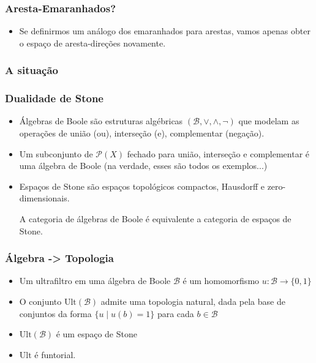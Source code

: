 \begin{frame}{}
\frametitle{Aresta-Emaranhados?}
    \begin{itemize}
        \item Se definirmos um análogo dos emaranhados para arestas, vamos apenas obter o espaço de aresta-direções novamente. 
    \end{itemize}
\end{frame}

\begin{frame}{}
\frametitle{A situação}
\end{frame}

\begin{frame}{}
\frametitle{Dualidade de Stone}
    \begin{itemize}
        \item Álgebras de Boole são estruturas algébricas $(\mathcal{B}, \vee, \wedge, \lnot)$ que modelam as operações de união (ou), interseção (e), complementar (negação). \pause
        \item Um subconjunto de $\mathcal{P}(X)$ fechado para união, interseção e complementar é uma álgebra de Boole \pause (na verdade, esses são todos os exemplos...) \pause
        \item Espaços de Stone são espaços topológicos compactos, Hausdorff e zero-dimensionais. \pause
        \begin{theorem}
            A categoria de álgebras de Boole é equivalente a categoria de espaços de Stone.
        \end{theorem}
    \end{itemize}
\end{frame}


\begin{frame}{}
\frametitle{Álgebra -> Topologia}
    \begin{itemize}
        \item Um ultrafiltro em uma álgebra de Boole $\mathcal{B}$ é um homomorfismo $u: \mathcal{B} \rightarrow \{0,1\}$ \pause
        \item O conjunto $\text{Ult}(\mathcal{B})$ admite uma topologia natural, dada pela base de conjuntos da forma $\{u \mid u(b) = 1\}$ para cada $b \in \mathcal{B}$ \pause
        \item $\text{Ult}(\mathcal{B})$ é um espaço de Stone \pause
        \item $\text{Ult}$ é funtorial.
    \end{itemize}
\end{frame}

